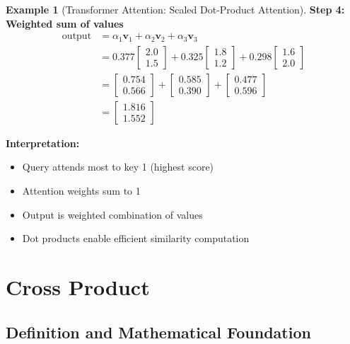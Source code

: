\documentclass[12pt,a4paper]{article}
\theoremstyle{definition}
\newtheorem{example}{Example}[section]
\begin{document}
\begin{example}[Transformer Attention: Scaled Dot-Product Attention]
\textbf{Step 4: Weighted sum of values}
\begin{align}
\text{output} &= \alpha_1\mathbf{v}_1 + \alpha_2\mathbf{v}_2 + \alpha_3\mathbf{v}_3 \\
&= 0.377\begin{bmatrix} 2.0 \\ 1.5 \end{bmatrix} + 0.325\begin{bmatrix} 1.8 \\ 1.2 \end{bmatrix} + 0.298\begin{bmatrix} 1.6 \\ 2.0 \end{bmatrix} \\
&= \begin{bmatrix} 0.754 \\ 0.566 \end{bmatrix} + \begin{bmatrix} 0.585 \\ 0.390 \end{bmatrix} + \begin{bmatrix} 0.477 \\ 0.596 \end{bmatrix} \\
&= \begin{bmatrix} 1.816 \\ 1.552 \end{bmatrix}
\end{align}

\textbf{Interpretation:}
\begin{itemize}
    \item Query attends most to key 1 (highest score)
    \item Attention weights sum to 1
    \item Output is weighted combination of values
    \item Dot products enable efficient similarity computation
\end{itemize}
\end{example}

\newpage
\section{Cross Product}

\subsection{Definition and Mathematical Foundation}
\end{document}
